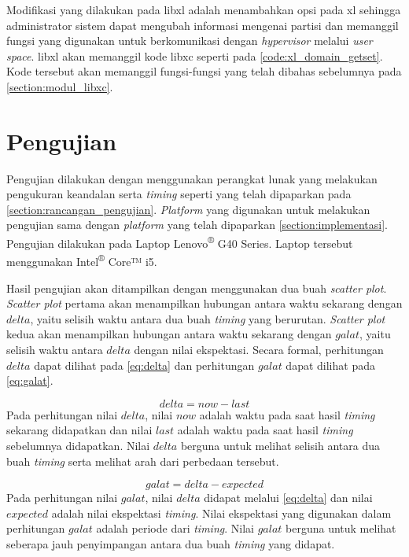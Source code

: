 Modifikasi yang dilakukan pada libxl adalah menambahkan opsi pada xl sehingga administrator
sistem dapat mengubah informasi mengenai partisi dan memanggil fungsi yang digunakan untuk
berkomunikasi dengan \textit{hypervisor} melalui \textit{user space}. libxl akan memanggil kode
libxc seperti pada \autoref{code:xl_domain_getset}. Kode tersebut akan memanggil fungsi-fungsi
yang telah dibahas sebelumnya pada \autoref{section:modul_libxc}.

\section{Pengujian}

Pengujian dilakukan dengan menggunakan perangkat lunak yang melakukan pengukuran keandalan serta
\textit{timing} seperti yang telah dipaparkan pada \autoref{section:rancangan_pengujian}.
\textit{Platform} yang digunakan untuk melakukan pengujian sama dengan \textit{platform} yang
telah dipaparkan \autoref{section:implementasi}. Pengujian dilakukan pada Laptop
Lenovo\textsuperscript{®} G40 Series. Laptop tersebut menggunakan Intel\textsuperscript{®} Core™
i5.

Hasil pengujian akan ditampilkan dengan menggunakan dua buah \textit{scatter plot}.
\textit{Scatter plot} pertama akan menampilkan hubungan antara waktu sekarang dengan $delta$,
yaitu selisih waktu antara dua buah \textit{timing} yang berurutan. \textit{Scatter plot} kedua
akan menampilkan hubungan antara waktu sekarang dengan $galat$, yaitu selisih waktu antara
$delta$ dengan nilai ekspektasi. Secara formal, perhitungan $delta$ dapat dilihat pada
\autoref{eq:delta} dan perhitungan $galat$ dapat dilihat pada \autoref{eq:galat}.

\begin{equation}\label{eq:delta}
	delta = now - last
\end{equation}
Pada perhitungan nilai $delta$, nilai $now$ adalah waktu pada saat hasil \textit{timing}
sekarang didapatkan dan nilai $last$ adalah waktu pada saat hasil \textit{timing} sebelumnya
didapatkan. Nilai $delta$ berguna untuk melihat selisih antara dua buah \textit{timing} serta
melihat arah dari perbedaan tersebut.

\begin{equation}\label{eq:galat}
	galat = delta - expected
\end{equation}
Pada perhitungan nilai $galat$, nilai $delta$ didapat melalui \autoref{eq:delta} dan nilai
$expected$ adalah nilai ekspektasi \textit{timing}. Nilai ekspektasi yang digunakan dalam
perhitungan $galat$ adalah periode dari \textit{timing}. Nilai $galat$ berguna untuk melihat
seberapa jauh penyimpangan antara dua buah \textit{timing} yang didapat.

